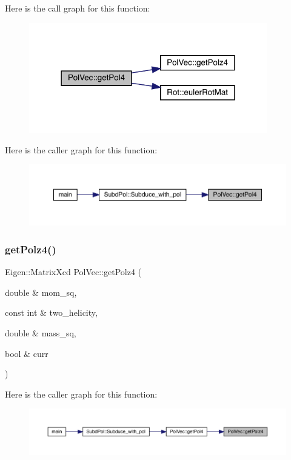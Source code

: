 Here is the call graph for this function\+:
\nopagebreak
\begin{figure}[H]
\begin{center}
\leavevmode
\includegraphics[width=294pt]{d7/d0c/namespacePolVec_ade32426820c06c6df537464fc4ae9475_cgraph}
\end{center}
\end{figure}
Here is the caller graph for this function\+:
\nopagebreak
\begin{figure}[H]
\begin{center}
\leavevmode
\includegraphics[width=350pt]{d7/d0c/namespacePolVec_ade32426820c06c6df537464fc4ae9475_icgraph}
\end{center}
\end{figure}
\mbox{\label{namespacePolVec_a447669c50a18d92dc7fc6b530588dc85}} 
\subsubsection{\texorpdfstring{getPolz4()}{getPolz4()}}
{\footnotesize\ttfamily Eigen\+::\+Matrix\+Xcd Pol\+Vec\+::get\+Polz4 (\begin{DoxyParamCaption}\item[{double \&}]{mom\+\_\+sq,  }\item[{const int \&}]{two\+\_\+helicity,  }\item[{double \&}]{mass\+\_\+sq,  }\item[{bool \&}]{curr }\end{DoxyParamCaption})}

Here is the caller graph for this function\+:
\nopagebreak
\begin{figure}[H]
\begin{center}
\leavevmode
\includegraphics[width=350pt]{d7/d0c/namespacePolVec_a447669c50a18d92dc7fc6b530588dc85_icgraph}
\end{center}
\end{figure}
